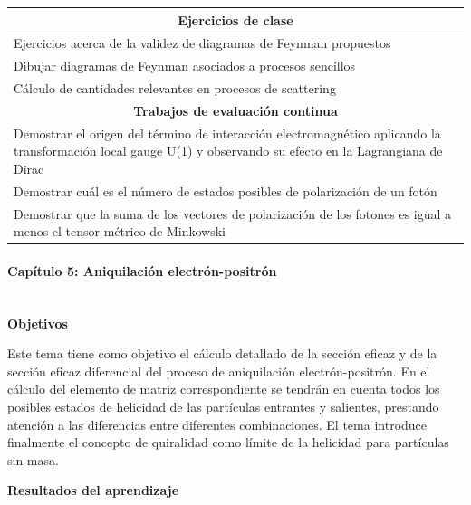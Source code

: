 \begin{center}
\begin{tabularx}{\textwidth}{|X|}
\hline\hline
\multicolumn{1}{|c|}{\textbf{Ejercicios de clase}}\\
\hline\hline
Ejercicios acerca de la validez de diagramas de Feynman propuestos \\
\hline
Dibujar diagramas de Feynman asociados a procesos sencillos \\
\hline 
Cálculo de cantidades relevantes en procesos de scattering \\
\hline\hline
\multicolumn{1}{|c|}{\textbf{Trabajos de evaluación continua}}\\
\hline\hline
Demostrar el origen del término de interacción electromagnético aplicando la transformación local gauge U(1) y observando su efecto en la Lagrangiana de Dirac \\
\hline
Demostrar cuál es el número de estados posibles de polarización de un fotón \\
\hline
Demostrar que la suma de los vectores de polarización de los fotones es igual a menos el tensor métrico de Minkowski \\
\hline\hline
\end{tabularx}
\end{center}


\paragraph{Capítulo 5: Aniquilación electrón-positrón\\\\}

\textbf{Objetivos}

Este tema tiene como objetivo el cálculo detallado de la sección eficaz y de la sección eficaz diferencial del proceso de aniquilación electrón-positrón. En el cálculo del elemento de matriz correspondiente se tendrán en cuenta todos los posibles estados de helicidad de las partículas entrantes y salientes, prestando atención a las diferencias entre diferentes combinaciones. El tema introduce finalmente el concepto de quiralidad como límite de la helicidad para partículas sin masa.   

\textbf{Resultados del aprendizaje}

